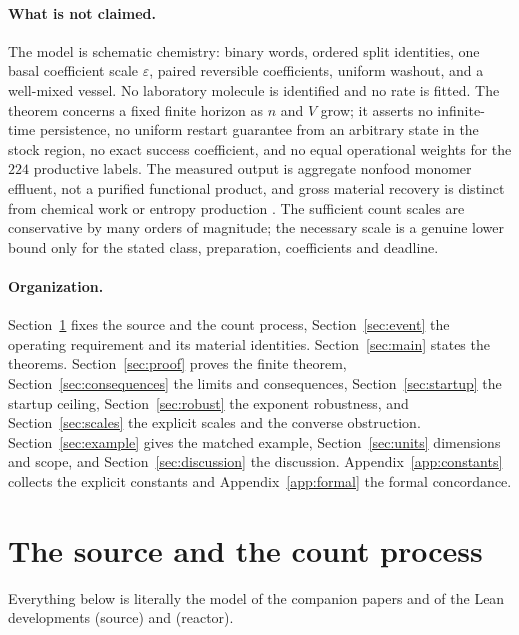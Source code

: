 \documentclass[11pt,letterpaper]{article}
\theoremstyle{plain}
\theoremstyle{definition}
\theoremstyle{remark}
\numberwithin{equation}{section}
\newcommand{\eps}{\varepsilon}
\begin{document}
\paragraph{What is not claimed.}
The model is schematic chemistry: binary words, ordered split identities, one basal coefficient scale $\eps$, paired reversible coefficients, uniform washout, and a well-mixed vessel. No laboratory molecule is identified and no rate is fitted. The theorem concerns a fixed finite horizon as $n$ and $V$ grow; it asserts no infinite-time persistence, no uniform restart guarantee from an arbitrary state in the stock region, no exact success coefficient, and no equal operational weights for the $224$ productive labels. The measured output is aggregate nonfood monomer effluent, not a purified functional product, and gross material recovery is distinct from chemical work or entropy production \cite{rao2016nonequilibrium}. The sufficient count scales are conservative by many orders of magnitude; the necessary scale is a genuine lower bound only for the stated class, preparation, coefficients and deadline.

\paragraph{Organization.}
Section~\ref{sec:model} fixes the source and the count process, Section~\ref{sec:event} the operating requirement and its material identities. Section~\ref{sec:main} states the theorems. Section~\ref{sec:proof} proves the finite theorem, Section~\ref{sec:consequences} the limits and consequences, Section~\ref{sec:startup} the startup ceiling, Section~\ref{sec:robust} the exponent robustness, and Section~\ref{sec:scales} the explicit scales and the converse obstruction. Section~\ref{sec:example} gives the matched example, Section~\ref{sec:units} dimensions and scope, and Section~\ref{sec:discussion} the discussion. Appendix~\ref{app:constants} collects the explicit constants and Appendix~\ref{app:formal} the formal concordance.

\section{The source and the count process}\label{sec:model}

Everything below is literally the model of the companion papers \cite{structural2026,diffuse2026} and of the Lean developments  (source) and  (reactor).
\end{document}
